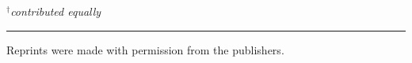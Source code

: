 \begin{enumerate}[P{A}PER I: ]


\end{enumerate}
\noindent \emph{$^{\dagger}$contributed equally}

\noindent
\rule{\linewidth}{0.5mm}

\vspace{2mm}

\noindent
Reprints were made with permission from the publishers.\\
\noindent \\



